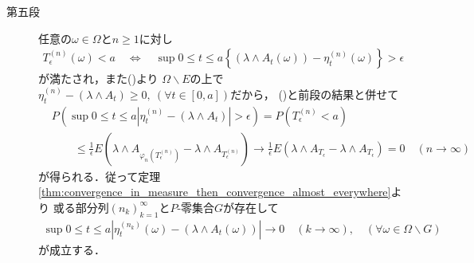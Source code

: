 \begin{prf}
\begin{description}
			\item[第五段]
				任意の$\omega \in \Omega$と$n \geq 1$に対し
				\begin{align}
					T^{(n)}_\epsilon(\omega) < a
					\quad \Longleftrightarrow \quad
					\sup{0 \leq t \leq a}{\left\{(\lambda \wedge A_t(\omega)) - \eta^{(n)}_t(\omega)\right\}} > \epsilon
				\end{align}
				が満たされ，また()より
				$\Omega \backslash E$の上で$\eta^{(n)}_t - (\lambda \wedge A_t) \geq 0,\ (\forall t \in [0,a])$だから，
				()と前段の結果と併せて
				\begin{align}
					&P\left(\sup{0 \leq t \leq a}{\left|\eta^{(n)}_t - (\lambda \wedge A_t)\right|} > \epsilon\right)
					= P\left(T^{(n)}_\epsilon < a\right) \\
					&\qquad \leq \frac{1}{\epsilon} E\left(\lambda \wedge A_{\varphi_n\left(T^{(n)}_\epsilon\right)} 
						- \lambda \wedge A_{T^{(n)}_\epsilon} \right)
					\longrightarrow \frac{1}{\epsilon} E\left(\lambda \wedge A_{T_\epsilon}
						- \lambda \wedge A_{T_\epsilon} \right) = 0 \quad (n \longrightarrow \infty)
				\end{align}
				が得られる．従って定理\ref{thm:convergence_in_measure_then_convergence_almost_everywhere}より
				或る部分列$(n_k)_{k=1}^\infty$と$P$-零集合$G$が存在して
				\begin{align}
					\sup{0 \leq t \leq a}{\left|\eta^{(n_k)}_t(\omega) - (\lambda \wedge A_t(\omega))\right|}
					\longrightarrow 0
					\quad (k \longrightarrow \infty),
					\quad (\forall \omega \in \Omega \backslash G)
					\label{eq:chapter_1_theorem_4_14_6}
				\end{align}
				が成立する．
				

\end{description}
\end{prf}
